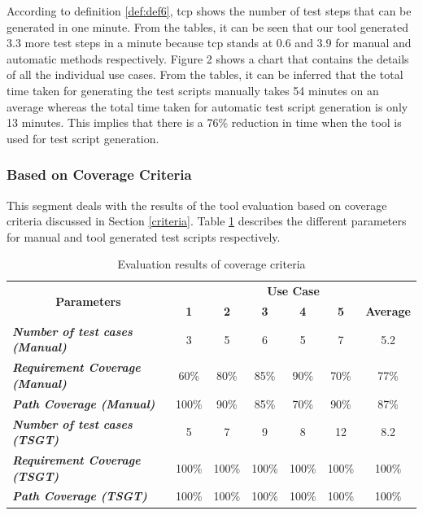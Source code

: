 According to definition \ref{def:def6}, \gls{tcp} shows the number of test steps that can be generated in one minute. From the tables, it can be seen that our tool generated 3.3 more test steps in a minute because \gls{tcp} stands at 0.6 and 3.9 for manual and automatic methods respectively. Figure 2 shows a chart that contains the details of all the individual use cases.
From the tables, it can be inferred that the total time taken for generating the test scripts manually takes 54 minutes on an average whereas the total time taken for automatic test script generation is only 13 minutes. This implies that there is a 76\% reduction in time when the tool is used for test script generation.

\subsubsection{Based on Coverage Criteria}

This segment deals with the results of the tool evaluation based on coverage criteria discussed in Section \ref{criteria}. Table \ref{tab:coverageresults} describes the different parameters for manual and tool generated test scripts respectively.
\begin{table}[htbp]
  \centering
  \caption{Evaluation results of coverage criteria}
  	\begin{adjustbox}{width=1\textwidth}
    \begin{tabular}{|l|c|c|c|c|c|c|}
    \toprule
    \multicolumn{1}{|c|}{\multirow{2}[4]{*}{\textbf{Parameters}}} & \multicolumn{6}{c|}{\textbf{Use Case }} \\
\cmidrule{2-7}          & \textbf{1} & \textbf{2} & \textbf{3} & \textbf{4} & \textbf{5} & \textbf{Average} \\
    \midrule
    \textit{\textbf{Number of test cases (Manual)}} & 3     & 5     & 6     & 5     & 7     & 5.2 \\
    \midrule
    \textit{\textbf{Requirement Coverage  (Manual)}} & 60\%  & 80\%  & 85\%  & 90\%  & 70\%  & 77\% \\
    \midrule
    \textit{\textbf{Path Coverage  (Manual)}} & 100\% & 90\%  & 85\%  & 70\%  & 90\%  & 87\% \\
    \midrule
    \textit{\textbf{Number of test cases  (TSGT)}} & 5     & 7     & 9     & 8     & 12    & 8.2 \\
    \midrule
    \textit{\textbf{Requirement Coverage (TSGT)}} & 100\% & 100\% & 100\% & 100\% & 100\% & 100\% \\
    \midrule
    \textit{\textbf{Path Coverage (TSGT)}} & 100\% & 100\% & 100\% & 100\% & 100\% & 100\% \\
    \bottomrule
    \end{tabular}%
    \end{adjustbox}
  \label{tab:coverageresults}%
\end{table}%

